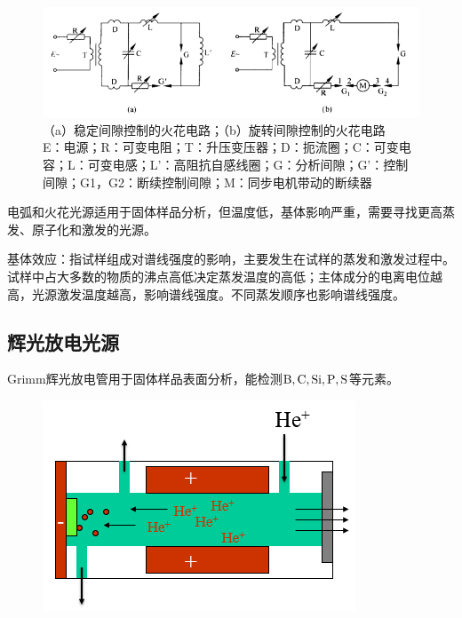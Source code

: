 \begin{figure}[!h]
	\centering
	\includegraphics[width=0.7\linewidth]{image/chp8_circuit_diagram3}
	\caption{（a）稳定间隙控制的火花电路；（b）旋转间隙控制的火花电路\\
		E：电源；R：可变电阻；T：升压变压器；D：扼流圈；C：可变电容；L：可变电感；L’：高阻抗自感线圈；G：分析间隙；G’：控制间隙；G1，G2：断续控制间隙；M：同步电机带动的断续器}
	\label{fig:chp8circuitdiagram3}
\end{figure}

电弧和火花光源适用于固体样品分析，但温度低，基体影响严重，需要寻找更高蒸发、原子化和激发的光源。

\begin{note}
	基体效应：指试样组成对谱线强度的影响，主要发生在试样的蒸发和激发过程中。试样中占大多数的物质的沸点高低决定蒸发温度的高低；主体成分的电离电位越高，光源激发温度越高，影响谱线强度。不同蒸发顺序也影响谱线强度。
\end{note}

\subsection{辉光放电光源}
Grimm辉光放电管用于固体样品表面分析，能检测$\ce{B,C,Si,P,S}$等元素。

\begin{figure}[!h]
	\centering
	\includegraphics[width=0.55\linewidth]{image/chp8_huiguang}
	\label{fig:chp8huiguang}
\end{figure}


